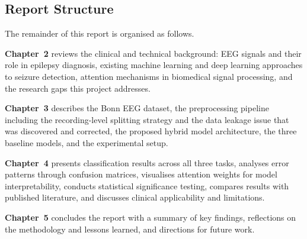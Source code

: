 \subsection{Report Structure}

The remainder of this report is organised as follows.

\textbf{Chapter~2} reviews the clinical and technical background: EEG signals and their role in epilepsy diagnosis, existing machine learning and deep learning approaches to seizure detection, attention mechanisms in biomedical signal processing, and the research gaps this project addresses.

\textbf{Chapter~3} describes the Bonn EEG dataset, the preprocessing pipeline including the recording-level splitting strategy and the data leakage issue that was discovered and corrected, the proposed hybrid model architecture, the three baseline models, and the experimental setup.

\textbf{Chapter~4} presents classification results across all three tasks, analyses error patterns through confusion matrices, visualises attention weights for model interpretability, conducts statistical significance testing, compares results with published literature, and discusses clinical applicability and limitations.

\textbf{Chapter~5} concludes the report with a summary of key findings, reflections on the methodology and lessons learned, and directions for future work.
